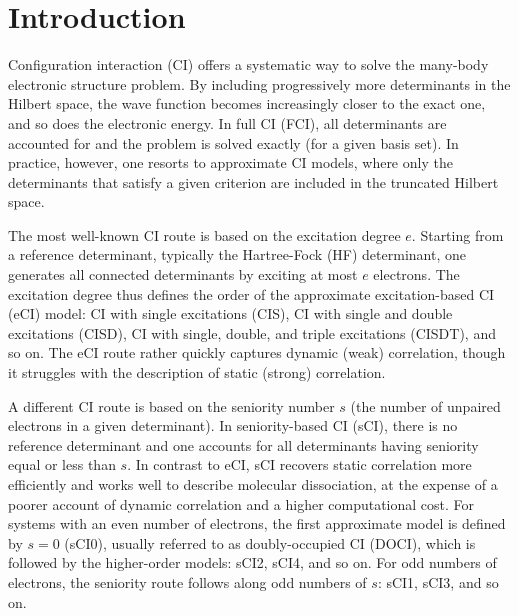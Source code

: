 \documentclass[aip,jcp,reprint,noshowkeys,superscriptaddress]{revtex4-1}
\begin{document}
\section{Introduction}
\label{sec:intro}

Configuration interaction (CI) offers a systematic way to solve the many-body electronic structure problem. \cite{SzaboBook,Helgakerbook}
By including progressively more determinants in the Hilbert space, the wave function becomes increasingly closer to the exact one, and so does the electronic energy.
In full CI (FCI), all determinants are accounted for and the problem is solved exactly (for a given basis set).
In practice, however, one resorts to approximate CI models, where only the determinants that satisfy a given criterion are included in the truncated Hilbert space.

The most well-known CI route is based on the excitation degree $e$.
Starting from a reference determinant, typically the Hartree-Fock (HF) determinant, one generates all connected determinants by exciting at most $e$ electrons.
The excitation degree thus defines the order of the approximate excitation-based CI (eCI) model:
CI with single excitations (CIS), CI with single and double excitations (CISD), CI with single, double, and triple excitations (CISDT), and so on.
The eCI route rather quickly captures dynamic (weak) correlation, though it struggles with the description of static (strong) correlation.

A different CI route is based on the seniority number $s$ (the number of unpaired electrons in a given determinant).
In seniority-based CI (sCI), \cite{Bytautas_2011,Allen_1962,Smith_1965,Veillard_1967} there is no reference determinant and one accounts for all determinants having seniority equal or less than $s$.
In contrast to eCI, sCI recovers static correlation more efficiently and works well to describe molecular dissociation, \cite{Bytautas_2015,Alcoba_2014,Alcoba_2014b}
at the expense of a poorer account of dynamic correlation and a higher computational cost.
For systems with an even number of electrons, the first approximate model is defined by $s=0$ (sCI0), usually referred to as doubly-occupied CI (DOCI),
which is followed by the higher-order models: sCI2, sCI4, and so on.
For odd numbers of electrons, the seniority route follows along odd numbers of $s$: sCI1, sCI3, and so on.
\end{document}
